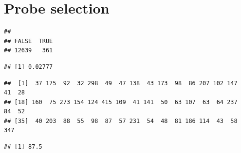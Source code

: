 \documentclass{article}
\begin{document}
\section{Probe selection}
\begin{knitrout}
\color{fgcolor}\begin{kframe}
\begin{alltt}
\hlopt{$}
\end{alltt}
\begin{verbatim}
## 
## FALSE  TRUE 
## 12639   361
\end{verbatim}
\begin{alltt}
\hlopt{$}
\end{alltt}
\begin{verbatim}
## [1] 0.02777
\end{verbatim}
\begin{alltt}
 
\end{alltt}
\begin{verbatim}
##  [1]  37 175  92  32 298  49  47 138  43 173  98  86 207 102 147  41  28
## [18] 160  75 273 154 124 415 109  41 141  50  63 107  63  64 237  84  52
## [35]  40 203  88  55  98  87  57 231  54  48  81 186 114  43  58 347
\end{verbatim}
\begin{alltt}
\hlstd{(} 
\end{alltt}
\begin{verbatim}
## [1] 87.5
\end{verbatim}
\end{kframe}
\end{knitrout}
\end{document}

